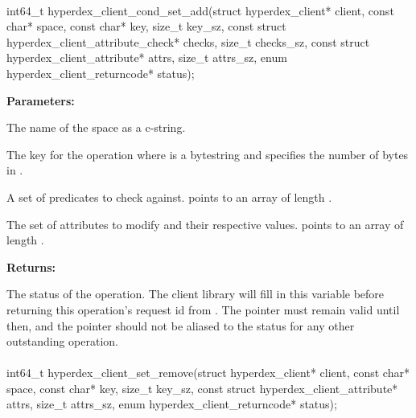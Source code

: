 \paragraph{}
\begin{ccode}
int64_t hyperdex_client_cond_set_add(struct hyperdex_client* client,
                const char* space,
                const char* key, size_t key_sz,
                const struct hyperdex_client_attribute_check* checks, size_t checks_sz,
                const struct hyperdex_client_attribute* attrs, size_t attrs_sz,
                enum hyperdex_client_returncode* status);
\end{ccode}
\funcdesc 

\noindent\textbf{Parameters:}
\begin{description}[labelindent=\widthof{{\code{checks}, \code{checks\_sz}}},leftmargin=*,noitemsep,nolistsep,align=right]
\item[\code{space}] The name of the space as a c-string.
\item[\code{key}, \code{key\_sz}] The key for the operation where  is a bytestring and  specifies the number of bytes in .
\item[\code{checks}, \code{checks\_sz}] A set of predicates to check against.   points to an array of length .
\item[\code{attrs}, \code{attrs\_sz}] The set of attributes to modify and their respective values.   points to an array of length .
\end{description}

\noindent\textbf{Returns:}
\begin{description}[labelindent=\widthof{{\code{status}}},leftmargin=*,noitemsep,nolistsep,align=right]
\item[\code{status}] The status of the operation.  The client library will fill in this variable before returning this operation's request id from .  The pointer must remain valid until then, and the pointer should not be aliased to the status for any other outstanding operation.
\end{description}

\paragraph{}
\begin{ccode}
int64_t hyperdex_client_set_remove(struct hyperdex_client* client,
                const char* space,
                const char* key, size_t key_sz,
                const struct hyperdex_client_attribute* attrs, size_t attrs_sz,
                enum hyperdex_client_returncode* status);
\end{ccode}
\funcdesc 

